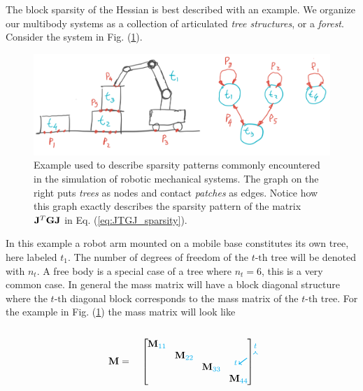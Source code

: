 The block sparsity of the Hessian is best described with an example. We organize
our multibody systems as a collection of articulated \emph{tree structures}, or
a \emph{forest}. Consider the system in Fig. (\ref{fig:sparsity_example}).
\begin{figure}[!h]
	\centering
	\includegraphics[width=0.7\columnwidth]{figures/sparsity_example.png}
	\caption{\label{fig:sparsity_example} 
	Example used to describe sparsity patterns commonly encountered in the
	simulation of robotic mechanical systems. The graph on the right puts
	\textit{trees} as nodes and contact \textit{patches} as edges. Notice how
	this graph exactly describes the sparsity pattern of the matrix
	${\mathbf{J}}^T{\mathbf{G}}{\mathbf{J}}$ in Eq. (\ref{eq:JTGJ_sparsity}).}
\end{figure}
In this example a robot arm mounted on a mobile base constitutes its own tree,
here labeled $t_1$. The number of degrees of freedom of the $t\text{-th}$ tree
will be denoted with $n_t$. A free body is a special case of a tree where
$n_t=6$, this is a very common case. In general the mass matrix will have a
block diagonal structure where the $t\text{-th}$ diagonal block corresponds to
the mass matrix of the $t\text{-th}$ tree. For the example in Fig.
(\ref{fig:sparsity_example}) the mass matrix will look like\\\\
\begin{equation}
	\mf{M}=\quad
	\begin{bmatrix}
		\tikzmark{M_topleft}
		\diagentry{\mf{M}_{\cc{11}}}&&&\tikzmark{M_topright}\\
		&\diagentry{\mf{M}_{\cc{22}}}\\
		&&\diagentry{\mf{M}_{\cc{33}}}\\		
		\tikzmark{M_bottomleft}&&&\diagentry{\mf{M}_{\cc{44}}}
	\end{bmatrix}
\tikz[overlay,remember picture] {
	\draw[->,thick,color=cyan]
  ([yshift=3ex]M_topleft) -- ([yshift=3ex]M_topright) node[midway,above]
  {\scriptsize $t$}; 
  \draw[->,thick,color=cyan]
  ([yshift=1.5ex,xshift=-2ex]M_topleft) -- ([xshift=-4ex]M_bottomleft)
  node[near end,left] {\scriptsize $t$};}	
\end{equation}

